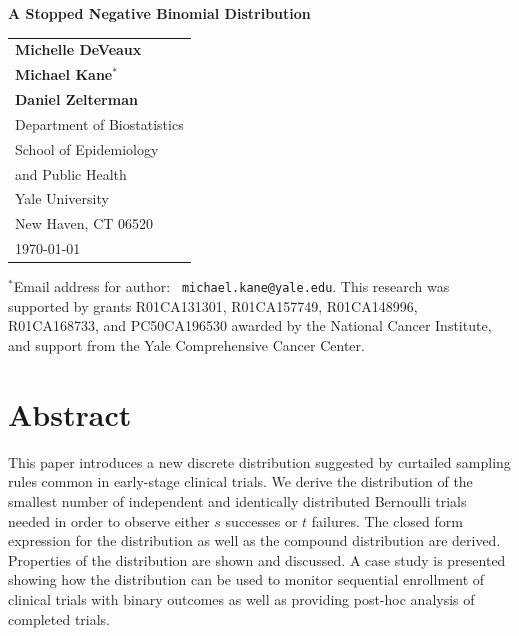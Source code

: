 \documentclass[12pt]{article}         %
\begin{document}
\thispagestyle{empty}
\begin{center}
\vspace*{\fill}

{\Large\bf A Stopped Negative Binomial Distribution} \\ [1ex]

\vspace*{1.25in}
\begin{tabular}{l} 
 {\bf Michelle DeVeaux} \\
 {\bf Michael Kane${}^*$} \\
 {\bf Daniel Zelterman}  \\[.1in]

 Department of Biostatistics \\
 School of Epidemiology  \\
 \hspace*{.15in} and Public Health  \\
 Yale University       \\
 New Haven, CT  06520  \\[.2in]

\today
\end{tabular}
\end{center}

\vspace*{\fill}

\noindent${}^*$Email address for author: {\tt
michael.kane@yale.edu}.  
This research was supported by grants R01CA131301, R01CA157749, R01CA148996, 
R01CA168733, and PC50CA196530 awarded by the National Cancer Institute, and 
support from the Yale Comprehensive Cancer Center.


\newpage
\thispagestyle{empty}

\section*    {\bf   Abstract}

This paper introduces a new discrete distribution suggested by curtailed 
sampling rules common in early-stage clinical trials. We derive the 
distribution of the smallest number of independent and identically 
distributed Bernoulli trials 
needed in order to observe either $s$ successes or $t$ failures. The closed 
form expression for the distribution as well as the compound distribution are 
derived. Properties of the distribution are shown and discussed. A case study 
is presented showing how the distribution can be used to monitor sequential 
enrollment of clinical trials with binary outcomes as well as providing 
post-hoc analysis of completed trials.
\end{document}
